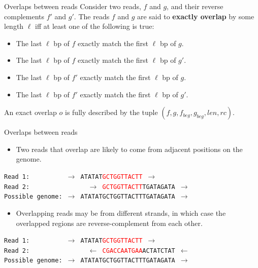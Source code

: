 \documentclass[xcolor=dvipsnames]{beamer}
\begin{document}
\begin{frame}{Overlaps between reads}
	Consider two reads, $f$ and $g$, and their reverse complements $f'$ and $g'$.
	The reads $f$ and $g$ are said to {\bf exactly overlap} by some length
	$\ell$ iff at least one of the following is true:
	\begin{itemize}
		\item The last $\ell$ bp of $f$ exactly match the first $\ell$ bp of
		$g$.
		\item The last $\ell$ bp of $f$ exactly match the first $\ell$ bp of
		$g'$.
		\item The last $\ell$ bp of $f'$ exactly match the first $\ell$ bp of
		$g$.
		\item The last $\ell$ bp of $f'$ exactly match the first $\ell$ bp of
		$g'$.
	\end{itemize}
	An exact overlap $o$ is fully described by the tuple $(f, g, f_{beg},
	g_{beg}, len, rc)$.
\end{frame}

\begin{frame}{Overlaps between reads}

	\begin{itemize}
	\item Two reads that overlap are likely to come from adjacent positions on the genome.
	\end{itemize}

	{\tt Read 1: \ \ \ \ \ \ \ \ \ $\rightarrow$ ATATAT\textcolor{red}{GCTGGTTACTT} $\rightarrow$ } \\
	{\tt Read 2: \ \ \ \ \ \ \ \ \ \ \ \ \ \ \ 
		$\rightarrow$ \textcolor{red}{GCTGGTTACTT}TGATAGATA $\rightarrow$ } \\
	{\tt Possible genome: $\rightarrow$ ATATATGCTGGTTACTTTGATAGATA $\rightarrow$}

	\begin{itemize}
	\item Overlapping reads may be from different strands, in which case the
	overlapped regions are reverse-complement from each other.
	\end{itemize}

	{\tt Read 1: \ \ \ \ \ \ \ \ \ 
			$\rightarrow$ ATATAT\textcolor{red}{GCTGGTTACTT} $\rightarrow$ } \\
	{\tt Read 2: \ \ \ \ \ \ \ \ \ \ \ \ \ \ \ 
			$\leftarrow$ \textcolor{red}{CGACCAATGAA}ACTATCTAT $\leftarrow$ } \\
	{\tt Possible genome: $\rightarrow$ ATATATGCTGGTTACTTTGATAGATA $\rightarrow$}
\end{frame}
\end{document}
